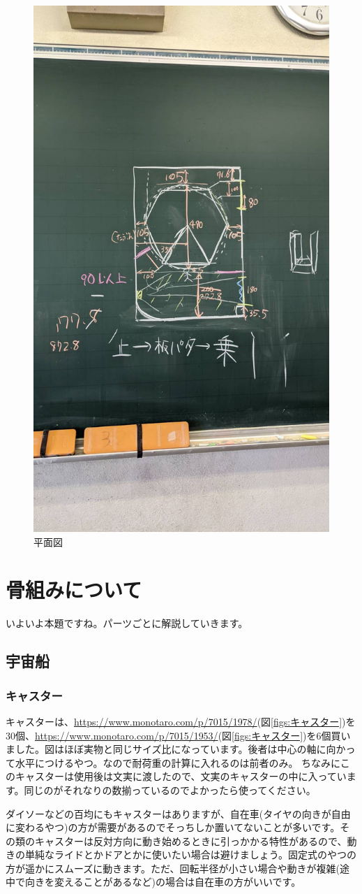 \documentclass{jsarticle}
\makeatletter
\newenvironment{imageHere}[2][htbp]{\def\@imageHereTmp{#2}%
    \begin{figure}[#1]
        \centering
}{%
        \caption{\@imageHereTmp}
        \label{figs:\@imageHereTmp}
    \end{figure}
}
\makeatother
\begin{document}
\begin{imageHere}{平面図}
    \includegraphics[width=0.45\linewidth]{images/plan/69138.jpg}
\end{imageHere}

\clearpage

\section{骨組みについて}

いよいよ本題ですね。パーツごとに解説していきます。

\subsection{宇宙船}
\subsubsection{キャスター}

キャスターは、\url{https://www.monotaro.com/p/7015/1978/}(図\ref{figs:キャスター})を30個、\url{https://www.monotaro.com/p/7015/1953/}(図\ref{figs:キャスター})を6個買いました。図はほぼ実物と同じサイズ比になっています。後者は中心の軸に向かって水平につけるやつ。なので耐荷重の計算に入れるのは前者のみ。
ちなみにこのキャスターは使用後は文実に渡したので、文実のキャスターの中に入っています。同じのがそれなりの数揃っているのでよかったら使ってください。

ダイソーなどの百均にもキャスターはありますが、自在車(タイヤの向きが自由に変わるやつ)の方が需要があるのでそっちしか置いてないことが多いです。その類のキャスターは反対方向に動き始めるときに引っかかる特性があるので、動きの単純なライドとかドアとかに使いたい場合は避けましょう。固定式のやつの方が遥かにスムーズに動きます。ただ、回転半径が小さい場合や動きが複雑(途中で向きを変えることがあるなど)の場合は自在車の方がいいです。
\end{document}
